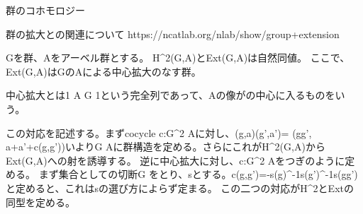 群のコホモロジー

群の拡大との関連について
https://ncatlab.org/nlab/show/group+extension

Gを群、Aをアーベル群とする。
H^2(G,A)とExt(G,A)は自然同値。
ここで、Ext(G,A)はGのAによる中心拡大のなす群。

中心拡大とは1 \to A \to {} \to G \to 1という完全列であって、Aの像がの中心に入るものをいう。

この対応を記述する。まずcocycle c:G^2 \to Aに対し、(g,a)(g’,a’)= (gg’, a+a’+c(g,g’))いよりG \times Aに群構造を定める。さらにこれがH^2(G,A)からExt(G,A)への射を誘導する。
逆に中心拡大に対し、c:G^2 \to Aをつぎのように定める。
まず集合としての切断G \to {}をとり、sとする。c(g,g’)=-s(g)^{-1}s(g’)^{-1}s(gg’)と定めると、これはsの選び方によらず定まる。
この二つの対応がH^2とExtの同型を定める。
